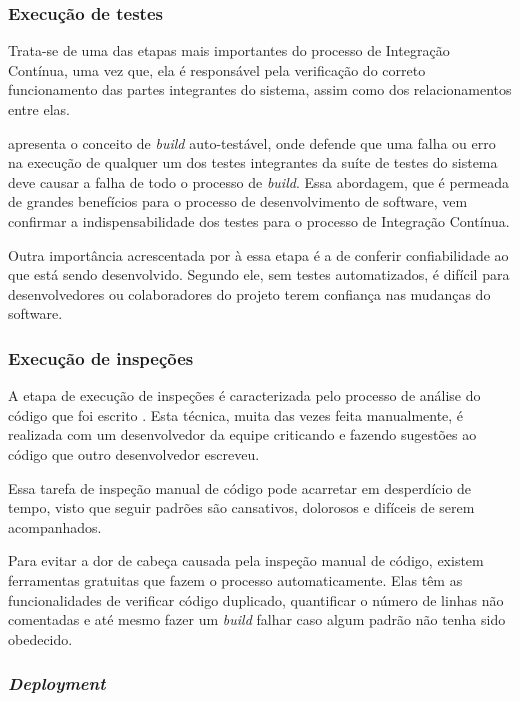 \subsubsection{Execução de testes}

Trata-se de uma das etapas mais importantes do processo de Integração Contínua, uma vez que, ela é responsável pela verificação do correto funcionamento das partes integrantes do sistema, assim como dos relacionamentos entre elas.

 apresenta o conceito de \textit{build} auto-testável, onde defende que uma falha ou erro na execução de qualquer um dos testes integrantes da suíte de testes do sistema deve causar a falha de todo o processo de \textit{build}. Essa abordagem, que é permeada de grandes benefícios para o processo de desenvolvimento de software, vem confirmar a indispensabilidade dos testes para o processo de Integração Contínua.

Outra importância acrescentada por  à essa etapa é a de conferir confiabilidade ao que está sendo desenvolvido. Segundo ele, sem testes automatizados, é difícil para desenvolvedores ou colaboradores do projeto terem confiança nas mudanças do software.

\subsubsection{Execução de inspeções}

A etapa de execução de inspeções é caracterizada pelo processo de análise do código que foi escrito \cite{DUVALL}. Esta técnica, muita das vezes feita manualmente, é realizada com um  desenvolvedor da equipe criticando e fazendo sugestões ao código que outro desenvolvedor escreveu.

Essa tarefa de inspeção manual de código pode acarretar em desperdício de tempo, visto que seguir padrões são cansativos, dolorosos e difíceis de serem acompanhados.

Para evitar a dor de cabeça causada pela inspeção manual de código, existem ferramentas gratuitas que fazem o processo automaticamente. Elas têm as funcionalidades de verificar código duplicado, quantificar o número de linhas não comentadas e até mesmo fazer um \textit{build} falhar caso algum padrão não tenha sido obedecido.

\subsubsection{\textit{Deployment}}

